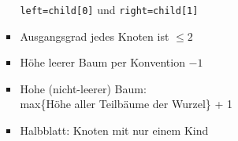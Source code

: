 \documentclass[
    12pt,
    a4paper,
    ngerman,
    color=3b,%
    marginpar=false,
    colorback=false,
    leqno,
]{tudaexercise}
\begin{document}
\begin{itemize}
\begin{itemize}
\begin{minipage}[t]{0.45\textwidth}
\begin{itemize}
                                  \texttt{left=child[0]} und \texttt{right=child[1]}
                            \item Ausgangsgrad jedes Knoten ist $\leq 2$
                            \item Höhe leerer Baum per Konvention $-1$
                            \item Hohe (nicht-leerer) Baum: \\
                                  max\{Höhe aller Teilbäume der Wurzel\} + 1
                            \item Halbblatt: Knoten mit nur einem Kind
                        \end{itemize}
                    \end{minipage}
          \end{itemize}



\end{itemize}
\end{document}
